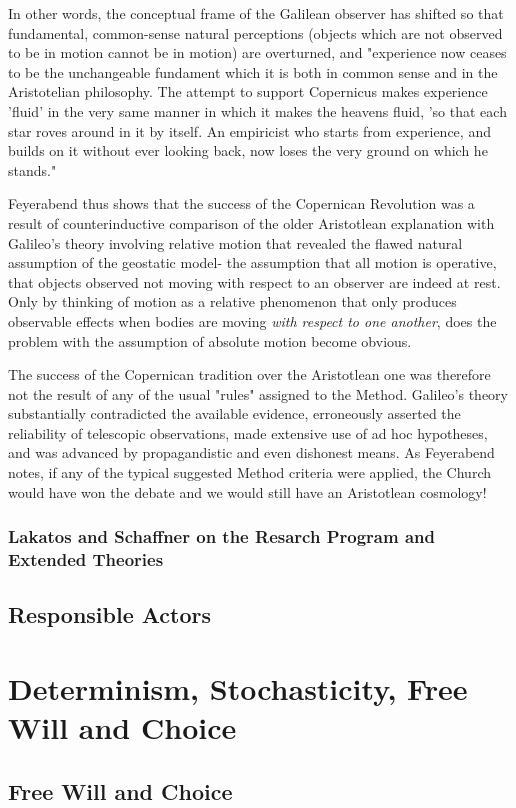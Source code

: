 In other words, the conceptual frame of the Galilean observer has shifted so that fundamental, common-sense natural perceptions (objects which are not observed to be in motion cannot be in motion) are overturned, and "experience now ceases to be the unchangeable fundament which it is both in common sense and in the Aristotelian philosophy.
The attempt to support Copernicus makes experience 'fluid' in the
very same manner in which it makes the heavens fluid, 'so that each
star roves around in it by itself. An empiricist who starts from
experience, and builds on it without ever looking back, now loses the
very ground on which he stands." \cite[p.72]{Feyerabend1993}

Feyerabend thus shows that the success of the Copernican Revolution was a result of counterinductive comparison of the older Aristotlean explanation with Galileo's theory involving relative motion that revealed the flawed natural assumption of the geostatic model- the assumption that all motion is operative, that objects observed not moving with respect to an observer are indeed at rest. Only by thinking of motion as a relative phenomenon that only produces observable effects when bodies are moving \textit{with respect to one another}, does the problem with the assumption of absolute motion become obvious.

The success of the Copernican tradition over the Aristotlean one was therefore not the result of any of the usual "rules" assigned to the Method. Galileo's theory substantially contradicted the available evidence, erroneously asserted the reliability of telescopic observations, made extensive use of ad hoc hypotheses, and was advanced by propagandistic and even dishonest means. As Feyerabend notes, if any of the typical suggested Method criteria were applied, the Church would have won the debate and we would still have an Aristotlean cosmology!



\subsubsection{Lakatos and Schaffner on the Resarch Program and Extended Theories}









\subsection{Responsible Actors}

\section{Determinism, Stochasticity, Free Will and Choice}
\subsection{Free Will and Choice}
\label{sec:choice}
